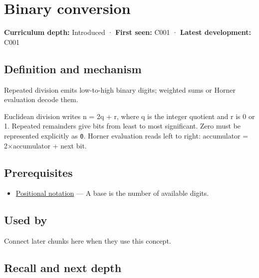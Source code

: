 \hypertarget{appendix-dc552784a2c0}{}\label{referencestart:appendix-dc552784a2c0}
\section{Binary conversion}\label{appendix-dc552784a2c0-binary-conversion}

\textbf{Curriculum depth:} Introduced · \textbf{First seen:} C001 · \textbf{Latest development:} C001

\begin{allmightroledefinition}

\subsection{Definition and mechanism}\label{appendix-dc552784a2c0-definition-and-mechanism}

Repeated division emits low-to-high binary digits; weighted sums or Horner evaluation decode them.

\end{allmightroledefinition}

Euclidean division writes n = 2q + r, where q is the integer quotient and r is 0 or 1. Repeated remainders give bits from least to most significant. Zero must be represented explicitly as \texttt{0}. Horner evaluation reads left to right: accumulator = 2×accumulator + next bit.

\subsection{Prerequisites}\label{appendix-dc552784a2c0-prerequisites}

\begin{itemize}
\tightlist
\item
  \hyperref[appendix-83c3f28f7bda]{Positional notation} --- A base is the number of available digits.
\end{itemize}

\subsection{Used by}\label{appendix-dc552784a2c0-used-by}

Connect later chunks here when they use this concept.

\subsection{Recall and next depth}\label{appendix-dc552784a2c0-recall-and-next-depth}

